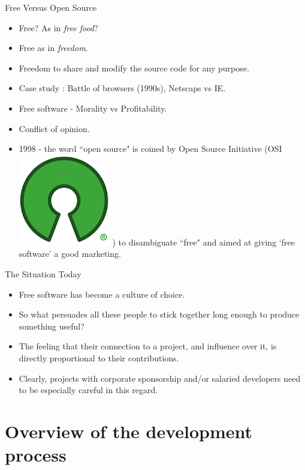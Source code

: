 \documentclass{beamer}
\begin{document}
\begin{frame}{Free Versus Open Source}
\begin{itemize}
	\item Free? As in \emph{free food}? \pause
	\item Free as in \emph{freedom}. \pause
	\item Freedom to share and modify the source code for any purpose.\pause
	\item Case study : Battle of browsers (1990s), Netscaps vs IE.\pause
	\item Free software - Morality vs Profitability.\pause
	\item Conflict of opinion.\pause
	\item 1998 - the word ``open source" is coined by Open Source Initiative (OSI \includegraphics[scale=0.1]{index.png} ) to disambiguate ``free" and aimed at giving `free software' a good marketing.
\end{itemize}
\end{frame}

\begin{frame}{The Situation Today}
\begin{itemize}
	\item Free software has become a culture of choice.\pause
	\item So what persuades all these people to stick together long enough to produce something useful? \pause
	\item The feeling that their connection to a project, and influence over it, is directly proportional to their contributions. \pause
	\item Clearly, projects with corporate sponsorship and/or salaried developers need to be especially careful in this regard.
\end{itemize}
\end{frame}

\section{Overview of the development process}
\end{document}
